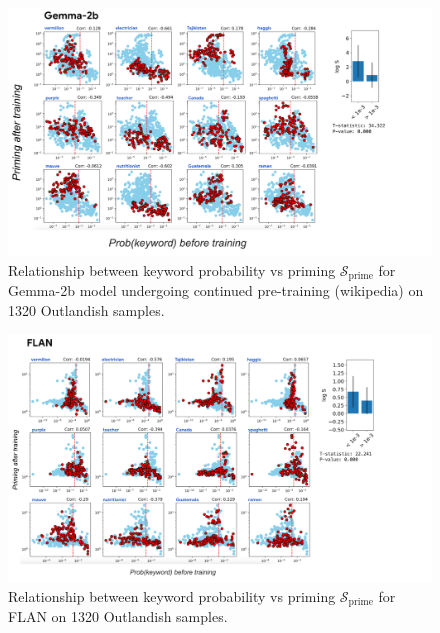 \documentclass[11pt, a4paper, logo, copyright]{googledeepmind}
\theoremstyle{plain}
\theoremstyle{definition}
\theoremstyle{remark}
\begin{document}
\begin{figure}[h]
\vspace{0mm}
    \centering \includegraphics[scale=.41,clip]{figures/Llama_App2.pdf}
    \vspace{-1mm}
    \caption{Relationship between keyword probability vs priming $\mathcal{S}_\text{prime}$ for Gemma-2b model undergoing continued pre-training (wikipedia) on 1320 Outlandish samples.} \label{fig:Llama_App2}
  \vspace{-0mm}
\end{figure}


\begin{figure}[h]
\vspace{0mm}
    \centering \includegraphics[scale=.35,clip]{figures/FLAN_App.pdf}
    \vspace{-1mm}
    \caption{Relationship between keyword probability vs priming $\mathcal{S}_\text{prime}$ for FLAN on 1320 Outlandish samples.} \label{fig:FLAN_App}
  \vspace{-0mm}
\end{figure}
\end{document}
